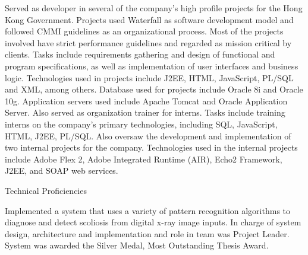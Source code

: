 \documentclass[10.5pt]{article}
\begin{document}
\begin{longtext}
Served as developer in several of the company's high profile projects for the Hong Kong
Government. Projects used Waterfall as software development model and followed CMMI
guidelines as an organizational process. Most of the projects involved have strict performance
guidelines and regarded as mission critical by clients. Tasks include requirements gathering and
design of functional and program specifications, as well as implementation of user interfaces and
business logic. Technologies used in projects include J2EE, HTML, JavaScript, PL/SQL and
XML, among others. Database used for projects include Oracle 8i and Oracle 10g. Application
servers used include Apache Tomcat and Oracle Application Server.
\shortskip
Also served as organization trainer for interns. Tasks include training interns on the company's
primary technologies, including SQL, JavaScript, HTML, J2EE, PL/SQL. Also oversaw the development and implementation of two internal projects for the company. Technologies used in the internal projects include Adobe Flex 2, Adobe Integrated Runtime (AIR), Echo2 Framework,
J2EE, and SOAP web services.\\
\end{longtext}

\begin{skillblock}{Technical Proficiencies}
\tinyskip
{}
\tinyskip
{}
\tinyskip
{}
\tinyskip
{}
\end{skillblock}
\shortskip


\begin{longtext}
Implemented a system that uses a variety of pattern recognition algorithms to diagnose and
detect scoliosis from digital x-ray image inputs. In charge
of system design, architecture and implementation and role in team was Project Leader. System was awarded the Silver
Medal, Most Outstanding Thesis Award.\\
\end{longtext}
\end{document}
